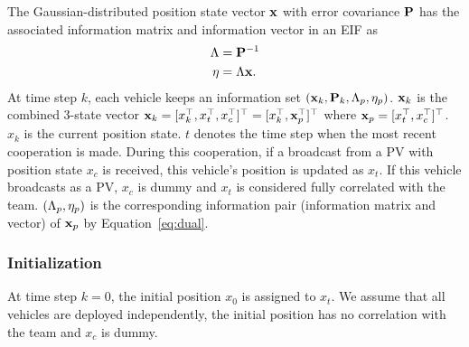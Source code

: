 The Gaussian-distributed position state vector ${\bf x}$ with error covariance $\bf P$ has the associated information matrix and information vector in an EIF as
\begin{equation}
\begin{split}
\label{eq:dual}
{\Lambda}&={\bf P}^{-1}\\
          {\bf\eta}&=\Lambda\bf{x}. \\
\end{split}
\end{equation}
At time step $k$, each vehicle keeps an information set $({\bf x}_k,{\bf{\bf P}}_k, {\Lambda}_p,{\bf\eta}_p)$. ${\bf x}_k$ is the combined 3-state vector ${\bf x}_k=[{x}_{k}^\top,{x}_t^\top,{x}_c^\top]^\top=[{x}_{k}^\top,{\bf x}_p^\top]^\top$ where ${\bf x}_p=[{x}_t^\top,{x}_c^\top]^\top$. $x_k$ is the current position state. $t$ denotes the time step when the most recent cooperation is made. During this cooperation, if a broadcast from a PV with position state $x_c$ is received, this vehicle's position is updated as $x_t$. If this vehicle broadcasts as a PV, $x_c$ is dummy and $x_t$ is considered fully correlated with the team. $({\Lambda}_p,{\bf\eta}_p)$ is the corresponding information pair (information matrix and vector) of ${\bf x}_p$ by Equation~\eqref{eq:dual}.

\subsubsection{Initialization}
At time step $k=0$, the initial position ${x}_0$ is assigned to ${x}_t$. We assume that all vehicles are deployed independently, the initial position has no correlation with the team and $x_c$ is dummy.

